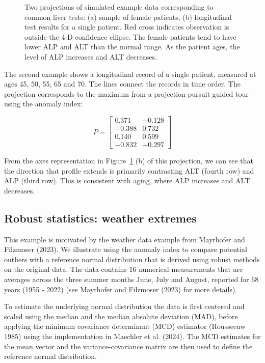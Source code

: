 \documentclass[
  12pt,
]{interact}
\begin{document}
\begin{figure}
\begin{minipage}{0.50\linewidth}
{}


\end{minipage}%

\caption{\label{fig-liver}Two projections of simulated example data
corresponding to common liver tests: (a) sample of female patients, (b)
longitudinal test results for a single patient. Red cross indicates
observation is outside the 4-D confidence ellipse. The female patients
tend to have lower ALP and ALT than the normal range. As the patient
ages, the level of ALP increases and ALT decreases.}

\end{figure}%

The second example shows a longitudinal record of a single patient,
measured at ages 45, 50, 55, 65 and 70. The lines connect the records in
time order. The projection corresponds to the maximum from a
projection-pursuit guided tour using the anomaly index:

\[
P = \left[ \begin{array}{rr}
            0.371 & -0.128 \\
            -0.388 & 0.732 \\
            0.140 & 0.599 \\
            -0.832 & -0.297 
            \end{array} \right]
\]

From the axes representation in Figure~\ref{fig-liver} (b) of this
projection, we can see that the direction that profile extends is
primarily contrasting ALT (fourth row) and ALP (third row). This is
consistent with aging, where ALP increases and ALT decreases.

\subsection{Robust statistics: weather extremes}\label{sec-weather}

This example is motivated by the weather data example from Mayrhofer and
Filzmoser (2023). We illustrate using the anomaly index to compare
potential outliers with a reference normal distribution that is derived
using robust methods on the original data. The data contains 16
numerical measurements that are averages across the three summer months
June, July and August, reported for 68 years (1955 - 2022) (see
Mayrhofer and Filzmoser (2023) for more details).

To estimate the underlying normal distribution the data is first
centered and scaled using the median and the median absolute deviation
(MAD), before applying the minimum covariance determinant (MCD)
estimator (Rousseeuw 1985) using the implementation in Maechler et al.
(2024). The MCD estimates for the mean vector and the
variance-covariance matrix are then used to define the reference normal
distribution.
\end{document}
